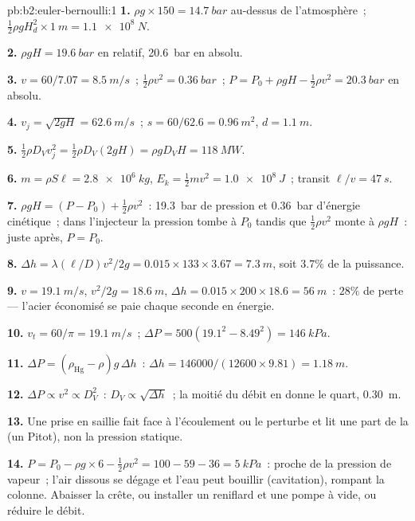 \begin{solution}{pb:b2:euler-bernoulli:1}
\textbf{1.} $\rho g \times 150 = \qty{14.7}{bar}$ au-dessus de l'atmosphère~; $\tfrac12\rho gH_d^2
\times \qty{1}{m} = \qty{1.1e8}{N}$.

\textbf{2.} $\rho gH = \qty{19.6}{bar}$ en relatif, \qty{20.6}{bar} en absolu.

\textbf{3.} $v = 60/7.07 = \qty{8.5}{m/s}$~; $\tfrac12\rho v^2 = \qty{0.36}{bar}$~; $P =
P_0 + \rho gH - \tfrac12\rho v^2 = \qty{20.3}{bar}$ en absolu.

\textbf{4.} $v_j = \sqrt{2gH} = \qty{62.6}{m/s}$~; $s = 60/62.6 = \qty{0.96}{m^2}$, $d =
\qty{1.1}{m}$.

\textbf{5.} $\tfrac12\rho D_Vv_j^2 = \tfrac12\rho D_V(2gH) = \rho gD_VH = \qty{118}{MW}$.

\textbf{6.} $m = \rho S\ell = \qty{2.8e6}{kg}$, $E_k = \tfrac12mv^2 = \qty{1.0e8}{J}$~;
transit $\ell/v = \qty{47}{s}$.

\textbf{7.} $\rho gH = (P - P_0) + \tfrac12\rho v^2$~: \qty{19.3}{bar} de pression
et \qty{0.36}{bar} d'énergie cinétique~; dans l'injecteur la pression tombe
à $P_0$ tandis que $\tfrac12\rho v^2$ monte à $\rho gH$~: juste après, $P = P_0$.

\textbf{8.} $\Delta h = \lambda(\ell/D)v^2/2g = 0.015 \times 133 \times 3.67 = \qty{7.3}{m}$,
soit $3.7\%$ de la puissance.

\textbf{9.} $v = \qty{19.1}{m/s}$, $v^2/2g = \qty{18.6}{m}$, $\Delta h = 0.015 \times 200 \times
18.6 = \qty{56}{m}$~: $28\%$ de perte --- l'acier économisé se paie chaque
seconde en énergie.

\textbf{10.} $v_t = 60/\pi = \qty{19.1}{m/s}$~; $\Delta P = 500(19.1^2 - 8.49^2) =
\qty{146}{kPa}$.

\textbf{11.} $\Delta P = (\rho_{\text{Hg}} - \rho)g\,\Delta h$~: $\Delta h = 146000/(12600
\times 9.81) = \qty{1.18}{m}$.

\textbf{12.} $\Delta P \propto v^2 \propto D_V^2$~: $D_V \propto \sqrt{\Delta h}$~; la moitié du
débit en donne le quart, \qty{0.30}{m}.

\textbf{13.} Une prise en saillie fait face à l'écoulement ou le perturbe et lit une part
de la  (un Pitot), non la pression statique.

\textbf{14.} $P = P_0 - \rho g \times 6 - \tfrac12\rho v^2 = 100 - 59 - 36 = \qty{5}{kPa}$~:
proche de la pression de vapeur~; l'air dissous se dégage et l'eau peut
bouillir (cavitation), rompant la colonne. Abaisser la crête, ou installer un
reniflard et une pompe à vide, ou réduire le débit.


\end{solution}
